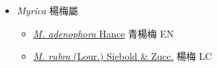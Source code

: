 
  \begin{itemize}
 \item[] \textit{Myrica} 楊梅屬
                                
  \begin{itemize}
        \item[] \href{http://www.theplantlist.org/tpl1.1/search?q=Myrica+adenophora}{\textit{M. adenophora} Hance}   青楊梅   EN
        \item[] \href{http://www.theplantlist.org/tpl1.1/search?q=Myrica+rubra}{\textit{M. rubra} (Lour.) Siebold \& Zucc.}   楊梅   LC
  \end{itemize}
  \end{itemize}
